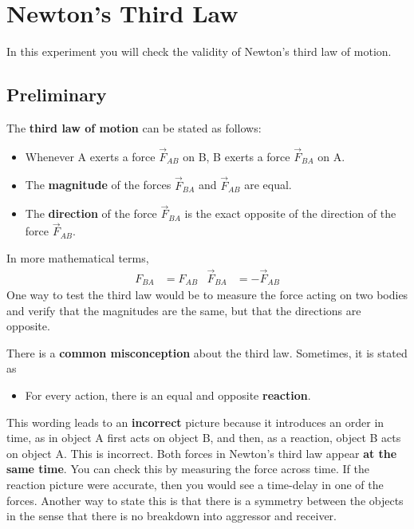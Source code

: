 \setcounter{chapter}{5}
\chapter{Newton's Third Law}
In this experiment you will check the validity of Newton's third law of motion.
\section{Preliminary}
The \textbf{third law of motion} can be stated as follows:
\begin{itemize}
    \item Whenever A exerts a force $\vec{F}_{AB}$ on B, B exerts a force $\vec{F}_{BA}$ on A.
    \item The \textbf{magnitude} of the forces $\vec{F}_{BA}$ and $\vec{F}_{AB}$ are equal.
    \item The \textbf{direction} of the force $\vec{F}_{BA}$ is the exact opposite of the direction of the force $\vec{F}_{AB}$.
\end{itemize}
In more mathematical terms,
\begin{align}
    F_{BA} &= F_{AB} & \vec{F}_{BA} &= - \vec{F}_{AB}
\end{align}
One way to test the third law would be to measure the force acting on two bodies and verify that the magnitudes are the same, but that the directions are opposite.

There is a \textbf{common misconception} about the third law. Sometimes, it is stated as
\begin{itemize}
    \item For every action, there is an equal and opposite \textbf{reaction}.
\end{itemize}
This wording leads to an \textbf{incorrect} picture because it introduces an order in time, as in object A first acts on object B, and then, as a reaction, object B acts on object A. This is incorrect. Both forces in Newton's third law appear \textbf{at the same time}. You can check this by measuring the force across time. If the reaction picture were accurate, then you would see a time-delay in one of the forces. Another way to state this is that there is a symmetry between the objects in the sense that there is no breakdown into aggressor and receiver.

